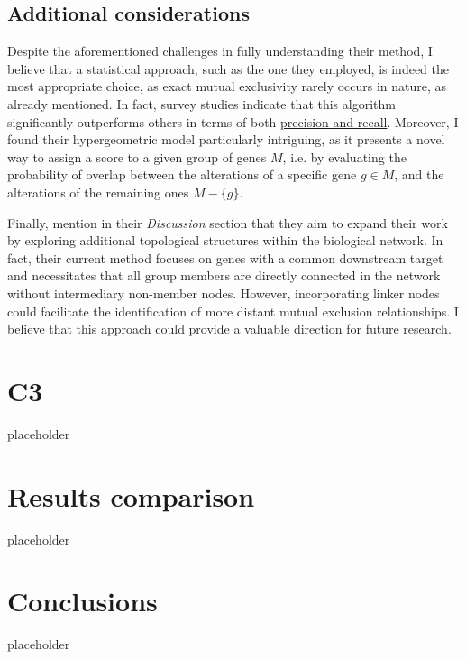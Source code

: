 \subsection{Additional considerations}

Despite the aforementioned challenges in fully understanding their method, I believe that a statistical approach, such as the one they employed, is indeed the most appropriate choice, as exact mutual exclusivity rarely occurs in nature, as already mentioned. In fact, survey studies \cite{survey} indicate that this algorithm significantly outperforms others in terms of both \href{https://en.wikipedia.org/wiki/Precision_and_recall}{precision and recall}. Moreover, I found their hypergeometric model particularly intriguing, as it presents a novel way to assign a score to a given group of genes $M$, i.e. by evaluating the probability of overlap between the alterations of a specific gene $g \in M$, and the alterations of the remaining ones $M-\{g\}$.

Finally, \textcite{mutex} mention in their \textit{Discussion} section that they aim to expand their work by exploring additional topological structures within the biological network. In fact, their current method focuses on genes with a common downstream target and necessitates that all group members are directly connected in the network without intermediary non-member nodes. However, incorporating linker nodes could facilitate the identification of more distant mutual exclusion relationships. I believe that this approach could provide a valuable direction for future research.

\section{C3}

placeholder 

\section{Results comparison}

placeholder 

\section{Conclusions}

placeholder 

\cleardoublepage
